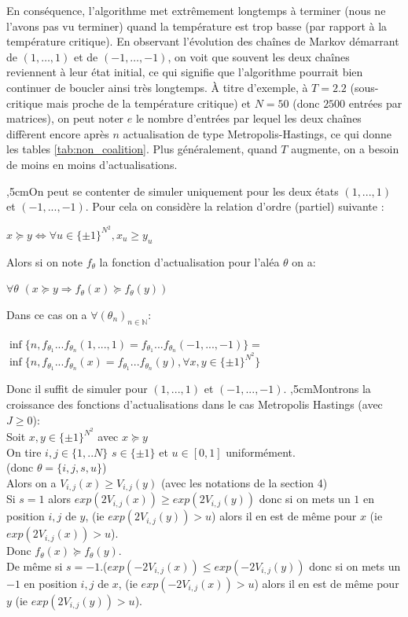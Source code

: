 \documentclass[a4paper,11pt]{article}
\begin{document}
En conséquence, l'algorithme met extrêmement longtemps à terminer (nous ne l'avons pas vu terminer) quand la température est trop basse (par rapport à la température critique). En observant l'évolution des chaînes de Markov démarrant de $(1,\hdots,1)$ et de $(-1,\hdots,-1)$, on voit que souvent les deux chaînes reviennent à leur état initial, ce qui signifie que l'algorithme pourrait bien continuer de boucler ainsi très longtemps. À titre d'exemple, à $T = 2.2$ (sous-critique mais proche de la température critique) et $N = 50$ (donc $2500$ entrées par matrices), on peut noter $e$ le nombre d'entrées par lequel les deux chaînes diffèrent encore après $n$ actualisation de type Metropolis-Hastings, ce qui donne les tables \ref{tab:non_coalition}. Plus généralement, quand $T$ augmente, on a besoin de moins en moins d'actualisations.



,5cmOn peut se contenter de simuler uniquement pour les deux états $(1,...,1)$ et $(-1,...,-1)$. Pour cela on considère la relation d'ordre (partiel) suivante :
\begin{center}
$x \succcurlyeq y \Leftrightarrow \forall u \in \{ \pm 1 \} ^{N^2} , x_u \geq y_u$ 
\end{center}
Alors si on note $f_{\theta}$ la fonction d'actualisation pour l'aléa $\theta$ on a:
\begin{center}
$\forall \theta$ $(x \succcurlyeq y \Rightarrow f_{\theta}(x) \succcurlyeq f_{\theta}(y)) $ 
\end{center}
Dans ce cas on a $\forall (\theta_n)_{n\in \mathbb{N}}$:
\begin{center}
$\inf\{n,f_{\theta_1}...f_{\theta_n}(1,...,1)=f_{\theta_1}...f_{\theta_n}(-1,...,-1)\}=$\\$ \inf\{n,f_{\theta_1}...f_{\theta_n}(x)=f_{\theta_1}...f_{\theta_n}(y), \forall x,y \in \{ \pm 1 \} ^{N^2} \}$
\end{center}
Donc il suffit de simuler pour $(1,...,1)$ et $(-1,...,-1)$.
,5cmMontrons la croissance des fonctions d'actualisations dans le cas Metropolis Hastings (avec $J\geq0$):
\\Soit $x,y \in  \{ \pm 1 \} ^{N^2}$ avec $x \succcurlyeq y$
\\On tire $i,j \in \{1,..N\}$ $s \in \{\pm 1\}$ et $u\in [0,1]$ uniformément. \\(donc $\theta = \{ i,j,s,u \}$)
\\Alors on a $V_{i,j}(x) \geq V_{i,j}(y)$ (avec les notations de la section 4) 
\\Si $s=1$ alors $exp(2V_{i,j}(x)) \geq exp(2V_{i,j}(y))$ donc si on mets un $1$ en position $i,j$ de $y$, (ie $exp(2V_{i,j}(y))>u$) alors il en est de même pour $x$ (ie $exp(2V_{i,j}(x))>u$).
\\Donc $f_{\theta}(x) \succcurlyeq f_{\theta}(y)$.
\\De même si $s=-1$.($exp(-2V_{i,j}(x)) \leq exp(-2V_{i,j}(y))$ donc si on mets un $-1$ en position $i,j$ de $x$, (ie $exp(-2V_{i,j}(x))>u$) alors il en est de même pour $y$ (ie $exp(2V_{i,j}(y))>u$).
\end{document}
